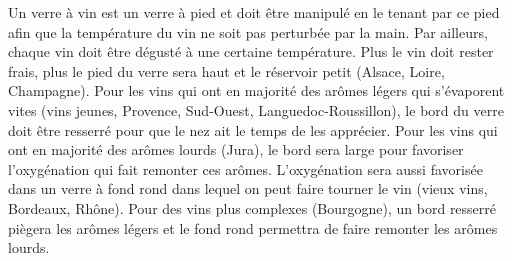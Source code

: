 \medskip
Un verre à vin est un verre à pied et doit être manipulé en le tenant par ce pied afin que la température du vin ne soit pas perturbée par la main. Par ailleurs, chaque vin doit être dégusté à une certaine température. Plus le vin doit rester frais, plus le pied du verre sera haut et le réservoir petit (Alsace, Loire, Champagne). Pour les vins qui ont en majorité des arômes légers qui s’évaporent vites (vins jeunes, Provence, Sud-Ouest, Languedoc-Roussillon), le bord du verre doit être resserré pour que le nez ait le temps de les apprécier. Pour les vins qui ont en majorité des arômes lourds (Jura), le bord sera large pour favoriser l’oxygénation qui fait remonter ces arômes. L’oxygénation sera aussi favorisée dans un verre à fond rond dans lequel on peut faire tourner le vin (vieux vins, Bordeaux, Rhône). Pour des vins plus complexes (Bourgogne), un bord resserré piègera les arômes légers et le fond rond permettra de faire remonter les arômes lourds.
  

